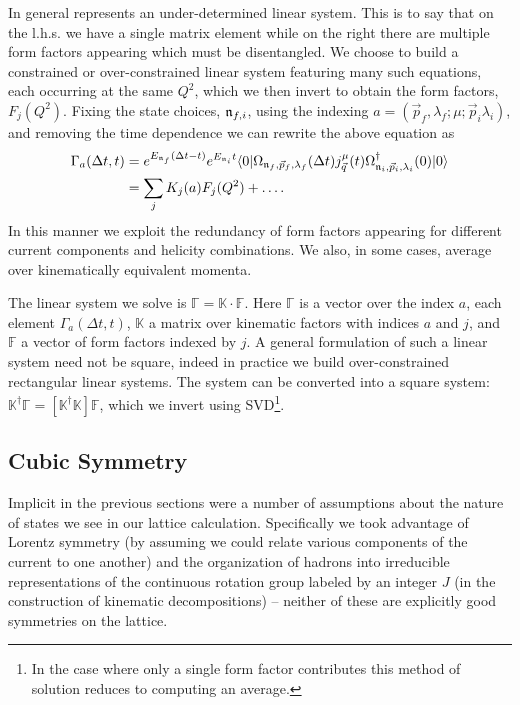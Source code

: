In general  represents an under-determined linear system. This is to say that on the l.h.s. we have a single matrix element while on the right there are multiple form factors appearing which must be disentangled. We choose to build a constrained or over-constrained linear system featuring many such equations, each occurring at the same $Q^2$, which we then invert to obtain the form factors, $F_j(Q^2)$. Fixing the state choices, $\mathfrak{n}_{f,i}$, using the indexing $a = \left(\vec{p}_f, \lambda_f;\mu;\vec{p}_i \lambda_i\right)$, and removing the time dependence we can rewrite the above equation as 
\begin{align}
\Gamma_a(\Delta t, t) &= e^{E_{\mathfrak{n}_f}(\Delta t - t)} e^{E_{\mathfrak{n}_i}t} \langle 0 | \Omega_{\mathfrak{n}_f,\vec{p}_f, \lambda_f}(\Delta t) j^\mu_{\vec{q}}(t) \Omega^\dagger_{\mathfrak{n}_i,\vec{p}_i, \lambda_i}(0) | 0 \rangle \notag \\
&= \sum_jK_j(a)F_j(Q^2) + \ldots.
\end{align}
In this manner we exploit the redundancy of form factors appearing for different current components and helicity combinations. We also, in some cases, average over kinematically equivalent momenta. 

The linear system we solve is $\mathbb{\Gamma} = \mathbb{K} \cdot \mathbb{F}$. Here $\mathbb{\Gamma}$ is a vector over the index $a$, each element $\Gamma_a(\Delta t,t)$, $\mathbb{K}$ a matrix over kinematic factors with indices $a$ and $j$, and $\mathbb{F}$ a vector of form factors indexed by $j$.  A general formulation of such a linear system need not be square, indeed in practice we build over-constrained rectangular linear systems. The system can be converted into a square system: $\mathbb{K}^\dagger \mathbb{\Gamma} = \left[ \mathbb{K}^\dagger \mathbb{K} \right ] \mathbb{F}$, which we invert using SVD\footnote{In the case where only a single form factor contributes this method of solution reduces to computing an average.}. 



\subsection{Cubic Symmetry} \label{sec::CubSym}
Implicit in the previous sections were a number of assumptions about the nature of states we see in our lattice calculation. Specifically we took advantage of Lorentz symmetry (by assuming we could relate various components of the current to one another) and the organization of hadrons into irreducible representations of the continuous rotation group labeled by an integer $J$ (in the construction of kinematic decompositions) -- neither of these are explicitly good symmetries on the lattice.  


